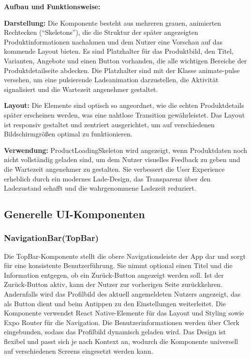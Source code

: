 \noindent\textbf{Aufbau und Funktionsweise:}

\textbf{Darstellung:}
Die Komponente besteht aus mehreren grauen, animierten Rechtecken (``Skeletons''), die die Struktur der später angezeigten Produktinformationen nachahmen und dem Nutzer eine Vorschau auf das kommende Layout bieten. Es sind Platzhalter für das Produktbild, den Titel, Varianten, Angebote und einen Button vorhanden, die alle wichtigen Bereiche der Produktdetailseite abdecken. Die Platzhalter sind mit der Klasse animate-pulse versehen, um eine pulsierende Ladeanimation darzustellen, die Aktivität signalisiert und die Wartezeit angenehmer gestaltet.

\textbf{Layout:}
Die Elemente sind optisch so angeordnet, wie die echten Produktdetails später erscheinen werden, was eine nahtlose Transition gewährleistet. Das Layout ist responsiv gestaltet und zentriert ausgerichtet, um auf verschiedenen Bildschirmgrößen optimal zu funktionieren.

\noindent\textbf{Verwendung:} ProductLoadingSkeleton wird angezeigt, wenn Produktdaten noch nicht vollständig geladen sind, um dem Nutzer visuelles Feedback zu geben und die Wartezeit angenehmer zu gestalten. Sie verbessert die User Experience erheblich durch ein modernes Lade-Design, das Transparenz über den Ladezustand schafft und die wahrgenommene Ladezeit reduziert.

\subsection{Generelle UI-Komponenten}

\subsubsection{NavigationBar(TopBar)}
Die TopBar-Komponente stellt die obere Navigationsleiste der App dar und sorgt für eine konsistente Benutzerführung. Sie nimmt optional einen Titel und die Information entgegen, ob ein Zurück-Button angezeigt werden soll. Ist der Zurück-Button aktiv, kann der Nutzer zur vorherigen Seite zurückkehren. Andernfalls wird das Profilbild des aktuell angemeldeten Nutzers angezeigt, das als Button dient und beim Antippen zu den Einstellungen weiterleitet. Die Komponente verwendet React Native-Elemente für das Layout und Styling sowie Expo Router für die Navigation. Die Benutzerinformationen werden über Clerk eingebunden, sodass das Profilbild dynamisch geladen wird. Das Design ist flexibel und passt sich je nach Kontext an, wodurch die Komponente universell auf verschiedenen Screens eingesetzt werden kann.

